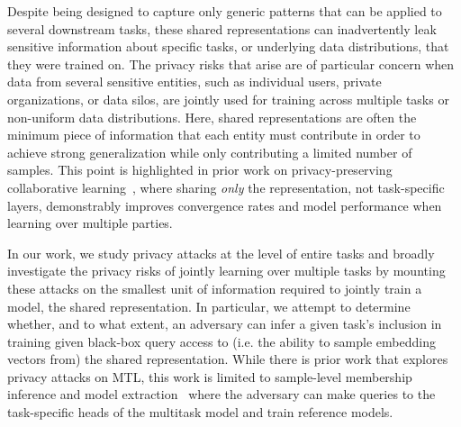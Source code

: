 Despite being designed to capture only generic patterns that can be applied to several downstream tasks, these shared representations can inadvertently leak sensitive information about specific tasks, or underlying data distributions, that they were trained on. The privacy risks that arise are of particular concern when data from several sensitive entities, such as individual users, private organizations, or data silos, are jointly used for training across multiple tasks or non-uniform data distributions. Here, shared representations are often the minimum piece of information that each entity must contribute in order to achieve strong generalization while only contributing a limited number of samples. This point is highlighted in prior work on privacy-preserving collaborative learning~\cite{shen2023sharerep}, where sharing \emph{only} the representation, not task-specific layers, demonstrably improves convergence rates and model performance when learning over multiple parties. 


In our work, we study privacy attacks at the level of entire tasks and broadly investigate the privacy risks of jointly learning over multiple tasks by mounting these attacks on the smallest unit of information required to jointly train a model, the shared representation. In particular, we attempt to determine whether, and to what extent, an adversary can infer a given task's inclusion in training given black-box query access to (i.e. the ability to sample embedding vectors from) the shared representation. While there is prior work that explores privacy attacks on MTL, this work is limited to sample-level membership inference and model extraction~\cite{yan2024miamtl} where the adversary can make queries to the task-specific heads of the multitask model and train reference models. 

